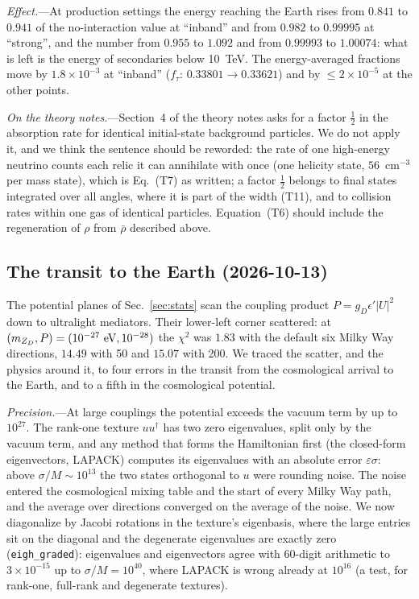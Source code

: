 \documentclass[11pt,a4paper]{article}
\newcommand{\mzd}{m_{Z_D}}
\newcommand{\gd}{g_D}
\newcommand{\epsp}{\epsilon'}
\begin{document}
\textit{Effect.}---At production settings the energy reaching the Earth rises from $0.841$ to
$0.941$ of the no-interaction value at ``inband'' and from $0.982$ to $0.99995$ at ``strong'',
and the number from $0.955$ to $1.092$ and from $0.99993$ to $1.00074$: what is left is the
energy of secondaries below 10~TeV. The energy-averaged fractions move by $1.8\times10^{-3}$ at
``inband'' ($f_\tau$: $0.33801\to0.33621$) and by $\le2\times10^{-5}$ at the other points.

\textit{On the theory notes.}---Section~4 of the theory notes asks for a factor $\tfrac12$ in the
absorption rate for identical initial-state background particles. We do not apply it, and we
think the sentence should be reworded: the rate of one high-energy neutrino counts each relic it
can annihilate with once (one helicity state, $56$~cm$^{-3}$ per mass state), which is Eq.~(T7)
as written; a factor $\tfrac12$ belongs to final states integrated over all angles, where it is
part of the width (T11), and to collision rates within one gas of identical particles.
Equation~(T6) should include the regeneration of $\rho$ from $\bar\rho$ described above.

\subsection{The transit to the Earth (2026-10-13)}
\label{app:transit}

The potential planes of Sec.~\ref{sec:stats} scan the coupling product $P = \gd\epsp|U|^2$ down to
ultralight mediators. Their lower-left corner scattered: at $(\mzd, P) = (10^{-27}~{\rm eV},
10^{-28})$ the $\chi^2$ was $1.83$ with the default six Milky Way directions, $14.49$ with 50 and
$15.07$ with 200. We traced the scatter, and the physics around it, to four errors in the
transit from the cosmological arrival to the Earth, and to a fifth in the cosmological potential.

\textit{Precision.}---At large couplings the potential exceeds the vacuum term by up to
$10^{27}$. The rank-one texture $u u^\dagger$ has two zero eigenvalues, split only by the vacuum
term, and any method that forms the Hamiltonian first (the closed-form eigenvectors, LAPACK)
computes its eigenvalues with an absolute error $\varepsilon\sigma$: above $\sigma/M\sim10^{13}$ the
two states orthogonal to $u$ were rounding noise. The noise entered the cosmological mixing table
and the start of every Milky Way path, and the average over directions converged on the average
of the noise. We now diagonalize by Jacobi rotations in the texture's eigenbasis, where the large
entries sit on the diagonal and the degenerate eigenvalues are exactly zero
(\texttt{eigh\_graded}): eigenvalues and eigenvectors agree with 60-digit arithmetic to
$3\times10^{-15}$ up to $\sigma/M = 10^{40}$, where LAPACK is wrong already at $10^{16}$ (a test,
for rank-one, full-rank and degenerate textures).
\end{document}
